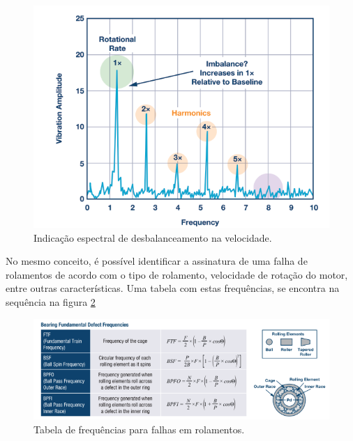 \begin{figure}[H]
    \caption{Indicação espectral de desbalanceamento na velocidade.}
    \begin{center}
        \includegraphics[scale=.5]{referencial/img/imbalance_analog_p2.png}
    \end{center}
    \label{fig:imbalance_analog_p2}
\end{figure}

No mesmo conceito, é possível identificar a assinatura de uma falha de rolamentos de acordo com o tipo de rolamento, velocidade de rotação
do motor, entre outras características. Uma tabela com estas frequências, se encontra na sequência na figura \ref{fig:bearing_table_analog_p3}


\begin{figure}[H]
    \caption{Tabela de frequências para falhas em rolamentos.}
    \begin{center}
        \includegraphics[scale=.7]{referencial/img/bearing_table_analog_p3.png}
    \end{center}
    \label{fig:bearing_table_analog_p3}
\end{figure}

